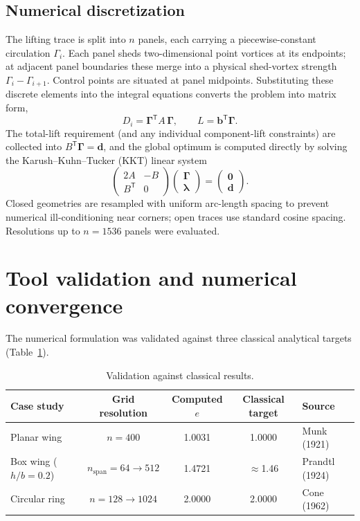 \documentclass[11pt]{article}
\begin{document}
\subsection{Numerical discretization}
The lifting trace is split into $n$ panels, each carrying a
piecewise-constant circulation $\Gamma_i$. Each panel sheds two-dimensional
point vortices at its endpoints; at adjacent panel boundaries these merge
into a physical shed-vortex strength $\Gamma_i - \Gamma_{i+1}$. Control
points are situated at panel midpoints. Substituting these discrete
elements into the integral equations converts the problem into matrix form,
\begin{equation}
D_i = \boldsymbol{\Gamma}^{\mathsf T} A\, \boldsymbol{\Gamma},
\qquad
L = \mathbf{b}^{\mathsf T} \boldsymbol{\Gamma}.
\end{equation}
The total-lift requirement (and any individual component-lift constraints)
are collected into $B^{\mathsf T}\boldsymbol{\Gamma} = \mathbf{d}$, and the
global optimum is computed directly by solving the Karush--Kuhn--Tucker
(KKT) linear system
\begin{equation}
\begin{pmatrix} 2A & -B \\ B^{\mathsf T} & 0 \end{pmatrix}
\begin{pmatrix} \boldsymbol{\Gamma} \\ \boldsymbol{\lambda} \end{pmatrix}
=
\begin{pmatrix} \mathbf{0} \\ \mathbf{d} \end{pmatrix}.
\end{equation}
Closed geometries are resampled with uniform arc-length spacing to prevent
numerical ill-conditioning near corners; open traces use standard cosine
spacing. Resolutions up to $n=1536$ panels were evaluated.

\section{Tool validation and numerical convergence}

The numerical formulation was validated against three classical analytical
targets (Table~\ref{tab:validation}).

\begin{table}[htb]
\centering
\caption{Validation against classical results.}
\label{tab:validation}
\begin{tabular}{lcccl}
\toprule
Case study & Grid resolution & Computed $e$ & Classical target & Source \\
\midrule
Planar wing & $n=400$ & 1.0031 & 1.0000 & Munk (1921) \\
Box wing ($h/b=0.2$) & $n_{\mathrm{span}}=64\to512$ & 1.4721 & $\approx$1.46 & Prandtl (1924) \\
Circular ring & $n=128\to1024$ & 2.0000 & 2.0000 & Cone (1962) \\
\bottomrule
\end{tabular}
\end{table}
\end{document}
